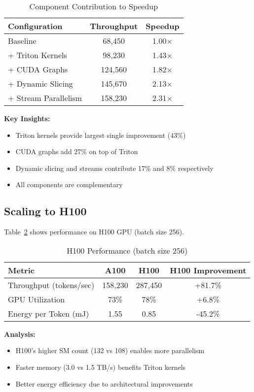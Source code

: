 \documentclass{article}
\begin{document}
\begin{table}[h]
\centering
\caption{Component Contribution to Speedup}
\label{tab:ablation}
\begin{tabular}{lcc}
\toprule
Configuration & Throughput & Speedup \\
\midrule
Baseline                  & 68,450  & 1.00$\times$ \\
+ Triton Kernels          & 98,230  & 1.43$\times$ \\
+ CUDA Graphs             & 124,560 & 1.82$\times$ \\
+ Dynamic Slicing         & 145,670 & 2.13$\times$ \\
+ Stream Parallelism      & 158,230 & 2.31$\times$ \\
\bottomrule
\end{tabular}
\end{table}

\textbf{Key Insights:}
\begin{itemize}
    \item Triton kernels provide largest single improvement (43\%)
    \item CUDA graphs add 27\% on top of Triton
    \item Dynamic slicing and streams contribute 17\% and 8\% respectively
    \item All components are complementary
\end{itemize}

\subsection{Scaling to H100}

Table~\ref{tab:h100} shows performance on H100 GPU (batch size 256).

\begin{table}[h]
\centering
\caption{H100 Performance (batch size 256)}
\label{tab:h100}
\begin{tabular}{lccc}
\toprule
Metric & A100 & H100 & H100 Improvement \\
\midrule
Throughput (tokens/sec) & 158,230 & 287,450 & +81.7\% \\
GPU Utilization         & 73\%    & 78\%    & +6.8\%  \\
Energy per Token (mJ)   & 1.55    & 0.85    & -45.2\% \\
\bottomrule
\end{tabular}
\end{table}

\textbf{Analysis:}
\begin{itemize}
    \item H100's higher SM count (132 vs 108) enables more parallelism
    \item Faster memory (3.0 vs 1.5 TB/s) benefits Triton kernels
    \item Better energy efficiency due to architectural improvements
\end{itemize}
\end{document}
